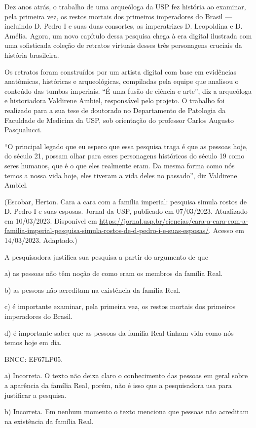 {Dez anos atrás, o trabalho de uma arqueóloga da USP fez história ao
examinar, pela primeira vez, os restos mortais dos primeiros imperadores
do Brasil --- incluindo D. Pedro I e suas duas consortes, as
imperatrizes D. Leopoldina e D. Amélia. Agora, um novo capítulo dessa
pesquisa chega à era digital ilustrada com uma sofisticada coleção de
retratos virtuais desses três personagens cruciais da história
brasileira.

Os retratos foram construídos por um artista digital com base em
evidências anatômicas, históricas e arqueológicas, compiladas pela
equipe que analisou o conteúdo das tumbas imperiais. ``É uma fusão de
ciência e arte'', diz a arqueóloga e historiadora Valdirene Ambiel,
responsável pelo projeto. O trabalho foi realizado para a sua tese de
doutorado no Departamento de Patologia da Faculdade de Medicina da USP,
sob orientação do professor Carlos Augusto Pasqualucci.

``O principal legado que eu espero que essa pesquisa traga é que as
pessoas hoje, do século 21, possam olhar para esses personagens
históricos do século 19 como seres humanos, que é o que eles realmente
eram. Da mesma forma como nós temos a nossa vida hoje, eles tiveram a
vida deles no passado'', diz Valdirene Ambiel.

(Escobar, Herton. Cara a cara com a família imperial: pesquisa simula
rostos de D. Pedro I e suas esposas. Jornal da USP, publicado em
07/03/2023. Atualizado em 10/03/2023. Disponível em
\url{https://jornal.usp.br/ciencias/cara-a-cara-com-a-familia-imperial-pesquisa-simula-rostos-de-d-pedro-i-e-suas-esposas/}.
Acesso em 14/03/2023. Adaptado.)

A pesquisadora justifica sua pesquisa a partir do argumento de que

a) as pessoas não têm noção de como eram os membros da família Real.

b) as pessoas não acreditam na existência da família Real.

c) é importante examinar, pela primeira vez, os restos mortais dos
primeiros imperadores do Brasil.

d) é importante saber que as pessoas da família Real tinham vida como
nós temos hoje em dia.

BNCC: EF67LP05.

a) Incorreta. O texto não deixa claro o conhecimento das pessoas em
geral sobre a aparência da família Real, porém, não é isso que a
pesquisadora usa para justificar a pesquisa.

b) Incorreta. Em nenhum momento o texto menciona que pessoas não
acreditam na existência da família Real.

}

